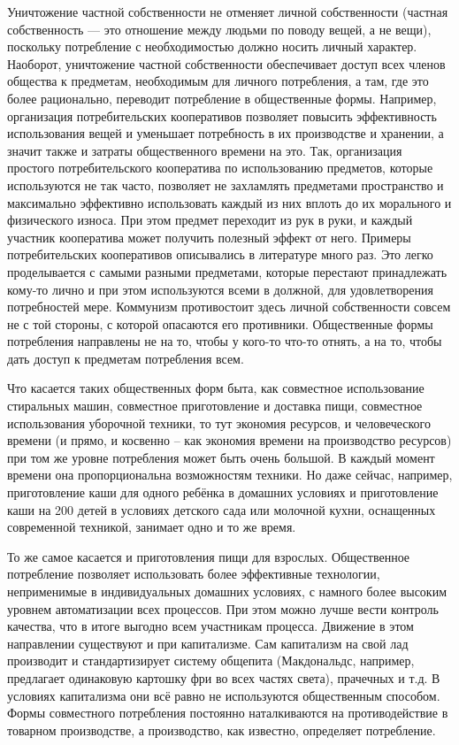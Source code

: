 \documentclass[../main]{subfiles}
\begin{document}
Уничтожение частной собственности не отменяет личной собственности (частная собственность — это отношение между людьми по поводу вещей, а не вещи), поскольку потребление с необходимостью должно носить личный характер. Наоборот, уничтожение частной собственности обеспечивает доступ всех членов общества к предметам, необходимым для личного потребления, а там, где это более рационально, переводит потребление в общественные формы. Например, организация потребительских кооперативов позволяет повысить эффективность использования вещей и уменьшает потребность в их производстве и хранении, а значит также и затраты общественного времени на это. Так, организация простого потребительского кооператива по использованию предметов, которые используются не так часто, позволяет не захламлять предметами пространство и максимально эффективно использовать каждый из них вплоть до их морального и физического износа. При этом предмет переходит из рук в руки, и каждый участник кооператива может получить полезный эффект от него. Примеры потребительских кооперативов описывались в литературе много раз. Это легко проделывается с самыми разными предметами, которые перестают принадлежать кому-то лично и при этом используются всеми в должной, для удовлетворения потребностей мере. Коммунизм противостоит здесь личной собственности совсем не с той стороны, с которой опасаются его противники. Общественные формы потребления направлены не на то, чтобы у кого-то что-то отнять, а на то, чтобы дать доступ к предметам потребления всем.

Что касается таких общественных форм быта, как совместное использование стиральных машин, совместное приготовление и доставка пищи, совместное использования уборочной техники, то тут экономия ресурсов, и человеческого времени (и прямо, и косвенно – как экономия времени на производство ресурсов) при том же уровне потребления может быть очень большой. В каждый момент времени она пропорциональна возможностям техники. Но даже сейчас, например, приготовление каши для одного ребёнка в домашних условиях и приготовление каши на 200 детей в условиях детского сада или молочной кухни, оснащенных современной техникой, занимает одно и то же время.

То же самое касается и приготовления пищи для взрослых. Общественное потребление позволяет использовать более эффективные технологии, неприменимые в индивидуальных домашних условиях, с намного более высоким уровнем автоматизации всех процессов. При этом можно лучше вести контроль качества, что в итоге выгодно всем участникам процесса. Движение в этом направлении существуют и при капитализме. Сам капитализм на свой лад производит и стандартизирует систему общепита (Макдональдс, например, предлагает одинаковую картошку фри во всех частях света), прачечных и т.д. В условиях капитализма они всё равно не используются общественным способом. Формы совместного потребления постоянно наталкиваются на противодействие в товарном производстве, а производство, как известно, определяет потребление.
\end{document}
